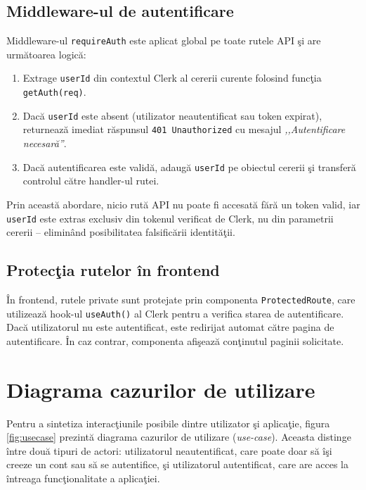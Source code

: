 \subsection{Middleware-ul de autentificare}

Middleware-ul \texttt{requireAuth} este aplicat global pe
toate rutele API \c si are urm\u atoarea logic\u a:

\begin{enumerate}
  \item Extrage \texttt{userId} din contextul Clerk al cererii
        curente folosind func\c tia \texttt{getAuth(req)}.
  \item Dac\u a \texttt{userId} este absent (utilizator
        neautentificat sau token expirat), returneaz\u a
        imediat r\u aspunsul \texttt{401 Unauthorized}
        cu mesajul \textit{,,Autentificare necesar\u a''}.
  \item Dac\u a autentificarea este valid\u a, adaug\u a
        \texttt{userId} pe obiectul cererii \c si transfer\u a
        controlul c\u atre handler-ul rutei.
\end{enumerate}

Prin aceast\u a abordare, nicio rut\u a API nu poate fi
accesat\u a f\u ar\u a un token valid, iar \texttt{userId}
este extras exclusiv din tokenul verificat de Clerk, nu
din parametrii cererii -- elimin\^ and posibilitatea
falsific\u arii identit\u a\c tii.

\subsection{Protec\c tia rutelor \^ in frontend}

\^ In frontend, rutele private sunt protejate prin componenta
\texttt{ProtectedRoute}, care utilizeaz\u a hook-ul
\texttt{useAuth()} al Clerk pentru a verifica starea de
autentificare. Dac\u a utilizatorul nu este autentificat,
este redirijat automat c\u atre pagina de autentificare.
\^ In caz contrar, componenta afi\c seaz\u a con\c tinutul
paginii solicitate.

\section{Diagrama cazurilor de utilizare}

Pentru a sintetiza interac\c tiunile posibile dintre utilizator \c si
aplica\c tie, figura \ref{fig:usecase} prezint\u a diagrama cazurilor
de utilizare (\textit{use-case}). Aceasta distinge \^ intre dou\u a
tipuri de actori: utilizatorul neautentificat, care poate doar s\u a
\^ i\c si creeze un cont sau s\u a se autentifice, \c si utilizatorul
autentificat, care are acces la \^ intreaga func\c tionalitate a
aplica\c tiei.


